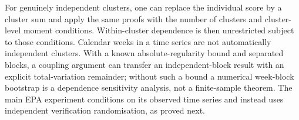 For genuinely independent clusters, one can replace the individual score by a cluster sum and apply the same proofs with the number of clusters and cluster-level moment conditions. Within-cluster dependence is then unrestricted subject to those conditions. Calendar weeks in a time series are not automatically independent clusters. With a known absolute-regularity bound and separated blocks, a coupling argument can transfer an independent-block result with an explicit total-variation remainder; without such a bound a numerical week-block bootstrap is a dependence sensitivity analysis, not a finite-sample theorem. The main EPA experiment conditions on its observed time series and instead uses independent verification randomisation, as proved next.

